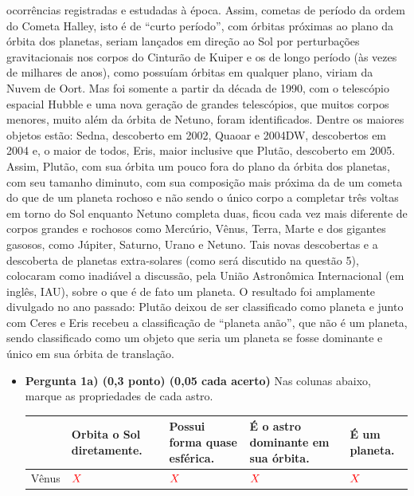 \documentclass[a4paper, 12pt]{article}
\newcommand{\red}[1]{\textcolor{red}{#1}}
\begin{document}
\begin{flushleft}
\begin{itemize}
ocorrências registradas e estudadas à época. Assim, cometas de período da ordem do Cometa Halley, isto é de ``curto período'', com órbitas próximas ao plano da órbita dos planetas, seriam lançados em direção ao Sol por perturbações gravitacionais nos corpos do Cinturão de Kuiper e os de longo período (às vezes de milhares de anos), como possuíam órbitas em qualquer plano, viriam da Nuvem de Oort. Mas foi somente a partir da década de 1990, com o telescópio espacial Hubble e uma nova geração de grandes telescópios, que muitos corpos menores, muito além da órbita de Netuno, foram identificados. Dentre os maiores objetos estão: Sedna, descoberto em 2002, Quaoar e 2004DW, descobertos em 2004 e, o maior de todos, Eris, maior inclusive que Plutão, descoberto em 2005. Assim, Plutão, com sua órbita um pouco fora do plano da órbita dos planetas, com seu tamanho diminuto, com sua composição mais próxima da de um cometa do que de um planeta rochoso e não sendo o único corpo a completar três voltas em torno do Sol enquanto Netuno completa duas, ficou cada vez mais diferente de corpos grandes e rochosos como Mercúrio, Vênus, Terra, Marte e dos gigantes gasosos, como Júpiter, Saturno, Urano e Netuno. Tais novas descobertas e a descoberta de planetas extra-solares (como será discutido na questão 5), colocaram como inadiável a discussão, pela União Astronômica Internacional (em inglês, IAU), sobre o que é de fato um planeta. O resultado foi amplamente divulgado no ano passado: Plutão deixou de ser classificado como planeta e junto com Ceres e Eris recebeu a classificação de ``planeta anão'', que não é um planeta, sendo classificado como um objeto que seria um planeta se fosse dominante e único em sua órbita de translação.
            \begin{itemize}
                \item \textbf{Pergunta 1a) (0,3 ponto) (0,05 cada acerto)} Nas colunas abaixo, marque as propriedades de cada astro.
                    \begin{center} \begin{tabular}
                    {
                        |M{0.15\textwidth}|M{0.15\textwidth}|M{0.15\textwidth}|M{0.15\textwidth}|M{0.15\textwidth}|
                    }
                        \hline
                        $\quad$ & Orbita o Sol diretamente. & Possui forma quase esférica. & É o astro dominante em sua órbita. & É um planeta. \\ \hline
                        Vênus & $\red{X}$ & $\red{X}$ & $\red{X}$ & $\red{X}$ \\ \hline

\end{tabular}
\end{center}
\end{itemize}
\end{itemize}
\end{flushleft}
\end{document}
